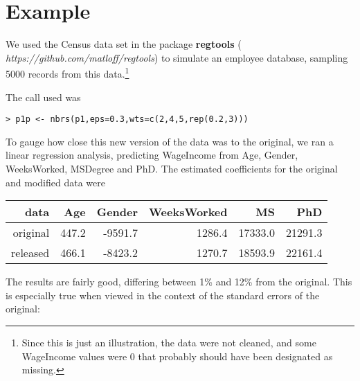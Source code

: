 \documentclass[11pt]{article}
\begin{document}
\section{Example}

We used the Census data set in the package {\bf regtools} ({\it
https://github.com/matloff/regtools}) to simulate an employee
database, sampling 5000 records from this data.\footnote{Since this is
just an illustration, the data were not cleaned, and some WageIncome
values were 0 that probably should have been designated as missing.}


The call used was

\begin{lstlisting}
> p1p <- nbrs(p1,eps=0.3,wts=c(2,4,5,rep(0.2,3)))
\end{lstlisting}

To gauge how close this new version of the data was to the original, we
ran a linear regression analysis, predicting WageIncome from Age,
Gender, WeeksWorked, MSDegree and PhD.  The estimated coefficients for
the original and modified data were

\begin{tabular}{|r|r|r|r|r|r|}
\hline
data & Age & Gender & WeeksWorked & MS & PhD \\ \hline 
original & 447.2 & -9591.7 & 1286.4 & 17333.0 & 21291.3 \\ \hline 
released & 466.1 & -8423.2 & 1270.7 & 18593.9 & 22161.4 \\ \hline 
\end{tabular}

The results are fairly good, differing between 1\% and 12\% from the
original.  This is especially true when viewed in the context of the
standard errors of the original:
\end{document}
